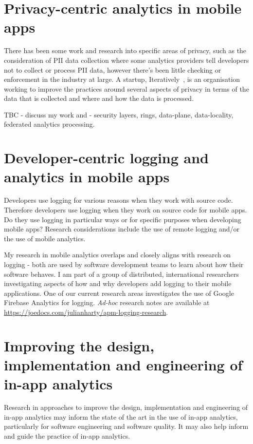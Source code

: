 \section{Privacy-centric analytics in mobile apps}
There has been some work and research into specific areas of privacy, such as the consideration of PII data collection where some analytics providers tell developers not to collect or process PII data, however there's been little checking or enforcement in the industry at large. A startup, Iteratively~\citep{iteratively_homepage}, is an organisation working to improve the practices around several aspects of privacy in terms of the data that is collected and where and how the data is processed.

TBC - discuss my work and - security layers, rings, data-plane, data-locality, federated analytics processing.

\section{Developer-centric logging and analytics in mobile apps}
Developers use logging for various reasons when they work with source code. Therefore developers use logging when they work on source code for mobile apps. Do they use logging in particular ways or for specific purposes when developing mobile apps? Research considerations include the use of remote logging and/or the use of mobile analytics.

My research in mobile analytics overlaps and closely aligns with research on logging - both are used by software development teams to learn about how their software behaves. I am part of a group of distributed, international researchers investigating aspects of how and why developers add logging to their mobile applications. One of our current research areas investigates the use of Google Firebase Analytics for logging. \emph{Ad-hoc} research notes are available at \url{https://joedocs.com/julianharty/apm-logging-research}.


\section{Improving the design, implementation and engineering of in-app analytics}
Research in approaches to improve the design, implementation and engineering of in-app analytics may inform the state of the art in the use of in-app analytics, particularly for software engineering and software quality. It may also help inform and guide the practice of in-app analytics. 

